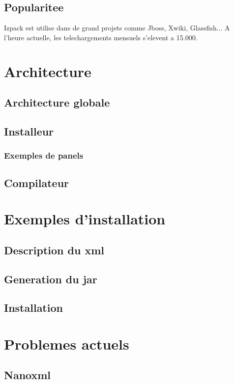 \subsection{Popularitee}
Izpack est utilise dans de grand projets comme Jboss, Xwiki, Glassfish... A l'heure actuelle, les telechargements mensuels s'elevent a 15.000.
\section{Architecture}

\subsection{Architecture globale}
\subsection{Installeur}
\subsubsection{Exemples de panels}
\subsection{Compilateur}

\section{Exemples d'installation}
\subsection{Description du xml}
\subsection{Generation du jar}
\subsection{Installation}
\section{Problemes actuels}
\subsection{Nanoxml}